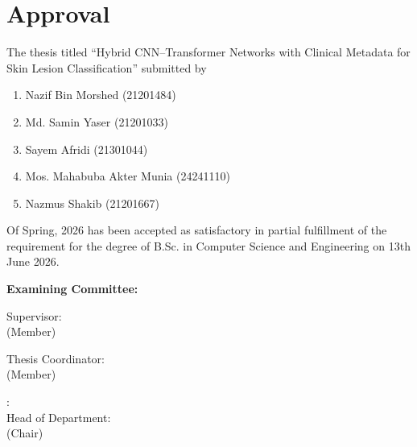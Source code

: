 \section*{Approval}

The thesis titled ``Hybrid CNN--Transformer Networks with Clinical
Metadata for Skin Lesion Classification'' submitted by
\begin{enumerate}
  \item Nazif Bin Morshed (21201484)
  \item Md. Samin Yaser (21201033)
  \item Sayem Afridi (21301044)
  \item Mos. Mahabuba Akter Munia (24241110)
  \item Nazmus Shakib (21201667)
\end{enumerate}

Of Spring, 2026 has been accepted as satisfactory in partial fulfillment of the requirement for the degree of B.Sc. in Computer Science and Engineering on 13th June 2026.

\vspace{0.5cm}
\textbf{Examining Committee:}

\vspace{1cm}

Supervisor:\\
(Member)
\begin{flushright}
\end{flushright}

Thesis Coordinator:\\
(Member)
\begin{flushright}
\end{flushright}

:\\

Head of Department:\\
(Chair)
\begin{flushright}
\end{flushright}

\pagebreak
